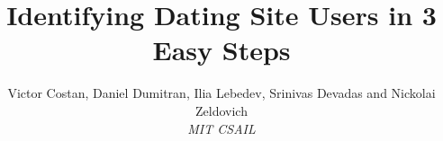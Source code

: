 \documentclass[10pt,twocolumn]{article}
\begin{document}
\title{Identifying Dating Site Users in 3 Easy Steps}
\author{
  Victor Costan, Daniel Dumitran, Ilia Lebedev,
  Srinivas Devadas and Nickolai Zeldovich \\ \em MIT CSAIL}
\date{}

\maketitle









\setlength{\bibsep}{1pt}
\small


\end{document}
